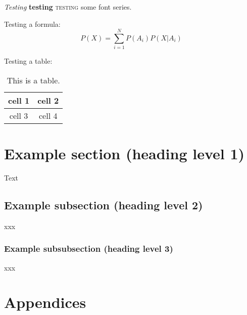 \documentclass[11pt, a4paper]{article}
\begin{document}
\textit{Testing} \textbf{testing} \textsc{testing} some font series.

Testing a formula:
\[
P(X) = \sum_{i=1}^N P(A_i) P(X|A_i)
\]

Testing a table:
\begin{table}[htbp]
\begin{center}
\begin{tabular}{c|c}
cell 1 & cell 2 \\
\hline
cell 3 & cell 4
\end{tabular}
\caption{This is a table.}
\end{center}
\end{table}

\newpage

\section{Example section (heading level 1)}

Text

\subsection{Example subsection (heading level 2)}

xxx

\subsubsection{Example subsubsection (heading level 3)}

xxx

\newpage





\newpage
\section{Appendices}
\end{document}
